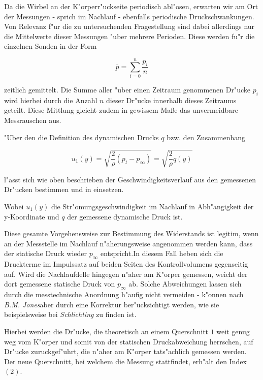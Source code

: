Da die Wirbel an der K"orperr"uckseite periodisch abl"osen, erwarten wir am Ort der Messungen - sprich im Nachlauf - ebenfalls periodische Druckschwankungen.
Von Relevanz f"ur die zu untersuchenden Fragestellung sind dabei allerdings nur die Mittelwerte dieser Messungen "uber mehrere Perioden.
Diese werden fu"r die einzelnen Sonden in der Form
\begin{center}	
	\begin{equation}
		\overline{p}=\sum_{i=0}^{n}\frac{p_i}{n}
	\end{equation}
\end{center}
zeitlich gemittelt.
Die Summe aller "uber einen Zeitraum genommenen Dr"ucke $p_i$ wird hierbei durch die Anzahl $n$ dieser Dr"ucke innerhalb dieses Zeitraums geteilt.
Diese Mittlung gleicht zudem in gewissem Ma\ss{}e das unvermeidbare Messrauschen aus.

"Uber den die Definition des dynamischen Drucks $q$ bzw. den Zusammenhang
\begin{center}
	\begin{equation}
		\label{geschwindigkeitsformel}
		u_{1}(y)= \sqrt{\frac{2}{\rho}(p_t - p_{\infty}) } = \sqrt{\frac{2}{\rho} q(y)}
	\end{equation}
\end{center}
l"asst sich wie oben beschrieben der Geschwindigkeitsverlauf aus den gemessenen Dr"ucken bestimmen und in  einsetzen.

Wobei $u_{1}(y)$ die Str"omungsgeschwindigkeit im Nachlauf in Abh"angigkeit der y-Koordinate und $q$ der gemessene dynamische Druck ist.

Diese gesamte Vorgehensweise zur Bestimmung des Widerstands ist legitim, wenn an der Messstelle im Nachlauf n"aherungsweise angenommen werden kann, dass der statische Druck wieder $p_\infty$ entspricht.In diesem Fall heben sich die Druckterme im Impulssatz auf  beiden Seiten des Kontrollvolumens gegenseitig auf.
Wird die Nachlaufdelle hingegen n"aher am K"orper gemessen, weicht der dort gemessene statische Druck von $p_{\infty}$ ab.
Solche Abweichungen lassen sich durch die messtechnische Anordnung h"aufig nicht vermeiden - 
k"onnen nach \textit{B.M. Jones}aber durch eine Korrektur ber"ucksichtigt werden, wie sie beispielsweise bei \textit{Schlichting} \cite{Schlichting.2001} zu finden ist.

Hierbei werden die Dr"ucke, die theoretisch an einem Querschnitt $1$  weit genug weg vom K"orper und somit von der statischen Druckabweichung herrschen, auf Dr"ucke zuruckgef"uhrt, die n"aher am K"orper tats"achlich gemessen werden\cite{Schlichting.2001}.
Der neue Querschnitt, bei welchem die Messung stattfindet, erh"alt den Index $(2)$.

